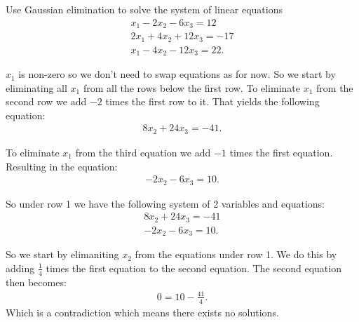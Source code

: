 \documentclass[10pt]{article}
\begin{document}
\begin{exercise}[System 3]  \label{exe:System_3}
Use Gaussian elimination to solve the system of linear equations
\begin{align*}
x_1 - 2x_2 -6x_3 = 12 \\
2x_1 + 4x_2 + 12x_3 = -17 \\
x_1 - 4x_2 - 12x_3 = 22
.
\end{align*}
\end{exercise}
\begin{solution}[]  \label{sol:}
\(x_1\) is non-zero so we don't need to swap equations as for now.
So we start by eliminating all \(x_1\) from
all the rows below the first row.
To eliminate \(x_1\) from the second row we add \(-2\) times the first row
to it. That yields the following equation:
\begin{align*}
8x_2 + 24x_3 = -41
.
\end{align*}

To eliminate \(x_1\) from the third equation we add \(-1\) times the first equation.
Resulting in the equation:
\begin{align*}
-2x_2 - 6 x_3 = 10
.
\end{align*}

So under row 1 we have the following system of 2 variables and equations:
\begin{align*}
8x_2 + 24x_3 = -41 \\
-2x_2 - 6x_3 = 10
.
\end{align*}

So we start by elimaniting \(x_2\) from the equations under row 1.
We do this by adding \(\frac{1}{4}\) times the first equation to the second
equation. The second equation then becomes:
\begin{align*}
0 = 10 - \frac{41}{4}
.
\end{align*}
Which is a contradiction which means there exists no solutions.

\end{solution}
\end{document}
